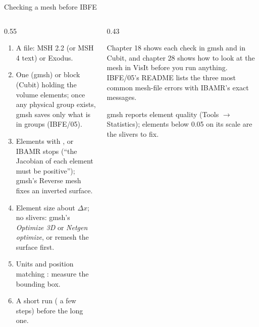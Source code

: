 \documentclass[aspectratio=169,11pt]{beamer}
\begin{document}
\begin{frame}{Checking a mesh before IBFE}
\begin{columns}[T,onlytextwidth]
\begin{column}{0.55\textwidth}
\footnotesize
\begin{enumerate}
  \item A  file: MSH 2.2 (or MSH 4 text) or Exodus.
  \item One  (gmsh) or block (Cubit) holding the volume elements; once any physical group exists, gmsh saves only what is in groups (IBFE/05).
  \item Elements with , or IBAMR stops (``the Jacobian of each element must be positive''); gmsh's Reverse mesh fixes an inverted surface.
  \item Element size about $\Delta x$; no slivers: gmsh's \emph{Optimize 3D} or \emph{Netgen optimize}, or remesh the surface first.
  \item Units and position matching : measure the bounding box.
  \item A short run ( a few steps) before the long one.
\end{enumerate}
\end{column}
\begin{column}{0.43\textwidth}
\begin{punchbox}
\small Chapter 18 shows each check in gmsh and in Cubit, and chapter 28 shows how to look at the mesh in VisIt before you run anything. IBFE/05's README lists the three most common mesh-file errors with IBAMR's exact messages.
\end{punchbox}
\vspace{1mm}
\small gmsh reports element quality (Tools $\to$ Statistics); elements below 0.05 on its scale are the slivers to fix.
\end{column}
\end{columns}
\end{frame}
\end{document}
